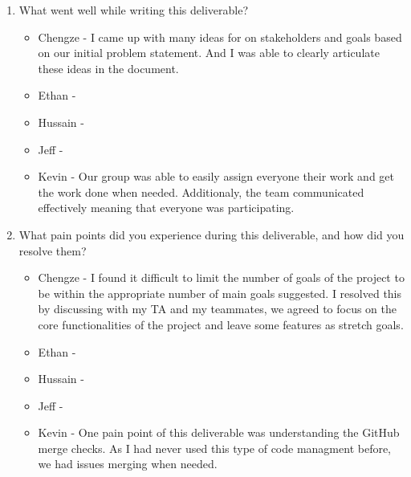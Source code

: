 \documentclass{article}
\begin{document}
\begin{enumerate}
    \item What went well while writing this deliverable? 
    \begin{itemize}
        \item Chengze - I came up with many ideas for on stakeholders 
        and goals based on our initial problem statement. And I was 
        able to clearly articulate these ideas in the document.
        \item Ethan - 
        \item Hussain -
        \item Jeff - 
        \item Kevin - Our group was able to easily assign everyone their work 
        and get the work done when needed. Additionaly, the team communicated 
        effectively meaning that everyone was participating.
    \end{itemize}

    \item What pain points did you experience during this deliverable, and how
    did you resolve them?
    \begin{itemize}
        \item Chengze - I found it difficult to limit the number 
        of goals of the project to be within the appropriate number 
        of main goals suggested. I resolved this by discussing with 
        my TA and my teammates, we agreed to focus on the core 
        functionalities of the project and leave some features as 
        stretch goals. 
        \item Ethan - 
        \item Hussain -
        \item Jeff - 
        \item Kevin - One pain point of this deliverable was understanding the 
        GitHub merge checks. As I had never used this type of code managment 
        before, we had issues merging when needed. 
    \end{itemize}
    

\end{enumerate}
\end{document}
